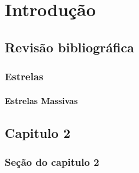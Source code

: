 \part{Introdução}
\chapter{Revisão bibliográfica}
\lipsum[1]
\section{Estrelas}
\lipsum[2]

\subsection{Estrelas Massivas}
\lipsum[3]
\chapter{Capitulo 2}
\section{Seção do capitulo 2}
\lipsum[1-3]
